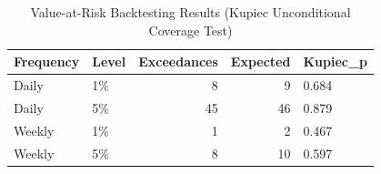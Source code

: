 \begin{table}[!h]
\centering
\caption{\label{tab:tab:var}Value-at-Risk Backtesting Results (Kupiec Unconditional Coverage Test)}
\centering
\begin{tabular}[t]{llrrl}
\toprule
Frequency & Level & Exceedances & Expected & Kupiec\_p\\
\midrule
Daily & 1\% & 8 & 9 & 0.684\\
Daily & 5\% & 45 & 46 & 0.879\\
Weekly & 1\% & 1 & 2 & 0.467\\
Weekly & 5\% & 8 & 10 & 0.597\\
\bottomrule
\end{tabular}
\end{table}
